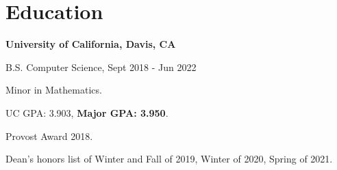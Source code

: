 \section{\sc Education}

{\bf University of California, Davis, CA}\\
\vspace*{-.1in}
\begin{list1}
\item[] B.S. Computer Science, Sept 2018 - Jun 2022
\begin{list2}
\vspace*{.05in}
\item Minor in Mathematics.
\item UC GPA: 3.903, \textbf{Major GPA: 3.950}.
\item Provost Award 2018.
\item Dean's honors list of Winter and Fall of 2019, Winter of 2020, Spring of 2021.
\end{list2}
\end{list1}


\endinput